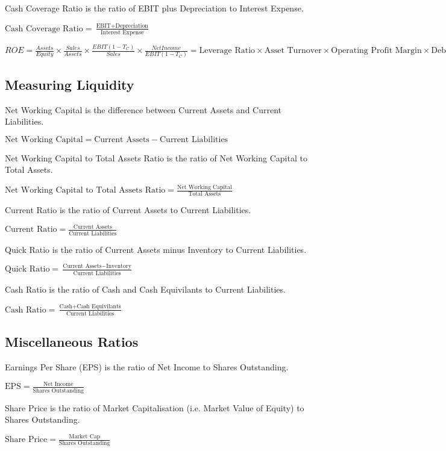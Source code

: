 Cash Coverage Ratio is the ratio of EBIT plus Depreciation to Interest Expense.

$\text{Cash Coverage Ratio} = \frac{\text{EBIT} + \text{Depreciation}}{\text{Interest Expense}}$

$ROE = \frac{Assets}{Equity} \times \frac{Sales}{Assets} \times \frac{EBIT(1-T_C)}{Sales} \times \frac{Net Income}{EBIT(1-T_C)} =  \text{Leverage Ratio} \times \text{Asset Turnover} \times \text{Operating Profit Margin} \times \text{Debt Burden}$


\subsection{Measuring Liquidity}

Net Working Capital is the difference between Current Assets and Current Liabilities.

$\text{Net Working Capital} = \text{Current Assets} - \text{Current Liabilities}$

Net Working Capital to Total Assets Ratio is the ratio of Net Working Capital to Total Assets.

$\text{Net Working Capital to Total Assets Ratio} = \frac{\text{Net Working Capital}}{\text{Total Assets}}$

Current Ratio is the ratio of Current Assets to Current Liabilities.

$\text{Current Ratio} = \frac{\text{Current Assets}}{\text{Current Liabilities}}$

Quick Ratio is the ratio of Current Assets minus Inventory to Current Liabilities.

$\text{Quick Ratio} = \frac{\text{Current Assets} - \text{Inventory}}{\text{Current Liabilities}}$

Cash Ratio is the ratio of Cash and Cash Equivilants to Current Liabilities.

$\text{Cash Ratio} = \frac{\text{Cash} + \text{Cash Equivilants}}{\text{Current Liabilities}}$


\subsection{Miscellaneous Ratios}
Earnings Per Share (EPS) is the ratio of Net Income to Shares Outstanding.

$\text{EPS} = \frac{\text{Net Income}}{\text{Shares Outstanding}}$

Share Price is the ratio of Market Capitalisation (i.e. Market Value of Equity) to Shares Outstanding.

$\text{Share Price} = \frac{\text{Market Cap}}{\text{Shares Outstanding}}$
